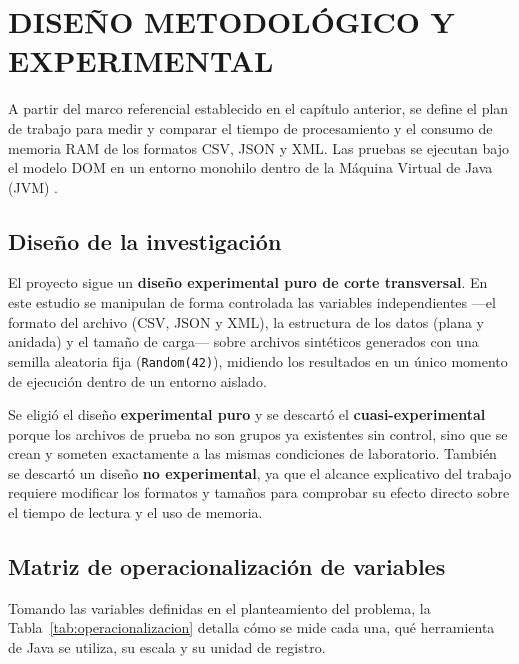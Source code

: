 \section{DISEÑO METODOLÓGICO Y EXPERIMENTAL}

A partir del marco referencial establecido en el capítulo anterior, se define el plan de trabajo para medir y comparar el tiempo de procesamiento y el consumo de memoria RAM de los formatos CSV, JSON y XML. Las pruebas se ejecutan bajo el modelo DOM en un entorno monohilo dentro de la Máquina Virtual de Java (JVM) \cite{w3cdom2004, oracle_jvm_spec}.

\subsection{Diseño de la investigación}

El proyecto sigue un \textbf{diseño experimental puro de corte transversal}. En este estudio se manipulan de forma controlada las variables independientes ---el formato del archivo (CSV, JSON y XML), la estructura de los datos (plana y anidada) y el tamaño de carga--- sobre archivos sintéticos generados con una semilla aleatoria fija (\texttt{Random(42)}), midiendo los resultados en un único momento de ejecución dentro de un entorno aislado.

Se eligió el diseño \textbf{experimental puro} y se descartó el \textbf{cuasi-experimental} porque los archivos de prueba no son grupos ya existentes sin control, sino que se crean y someten exactamente a las mismas condiciones de laboratorio. También se descartó un diseño \textbf{no experimental}, ya que el alcance explicativo del trabajo requiere modificar los formatos y tamaños para comprobar su efecto directo sobre el tiempo de lectura y el uso de memoria.

\subsection{Matriz de operacionalización de variables}

Tomando las variables definidas en el planteamiento del problema, la Tabla~\ref{tab:operacionalizacion} detalla cómo se mide cada una, qué herramienta de Java se utiliza, su escala y su unidad de registro.

